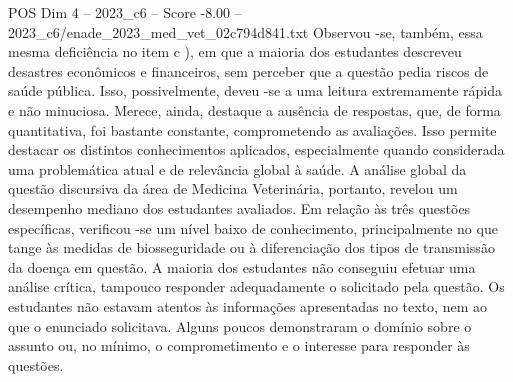 \begin{textsample}{POS Dim 4 – 2023\_c6 – Score -8.00 – 2023\_c6/enade\_2023\_med\_vet\_02c794d841.txt}
Observou -se, também, essa mesma deficiência no item c ), em que a maioria dos estudantes descreveu desastres econômicos e financeiros, sem perceber que a questão pedia riscos de saúde pública.
Isso, possivelmente, deveu -se a uma leitura extremamente rápida e não minuciosa.
Merece, ainda, destaque a ausência de respostas, que, de forma quantitativa, foi bastante constante, comprometendo as avaliações.
Isso permite destacar os distintos conhecimentos aplicados, especialmente quando considerada uma problemática atual e de relevância global à saúde.
A análise global da questão discursiva da área de Medicina Veterinária, portanto, revelou um desempenho mediano dos estudantes avaliados.
Em relação às três questões específicas, verificou -se um nível baixo de conhecimento, principalmente no que tange às medidas de biosseguridade ou à diferenciação dos tipos de transmissão da doença em questão.
A maioria dos estudantes não conseguiu efetuar uma análise crítica, tampouco responder adequadamente o solicitado pela questão.
Os estudantes não estavam atentos às informações apresentadas no texto, nem ao que o enunciado solicitava.
Alguns poucos demonstraram o domínio sobre o assunto ou, no mínimo, o comprometimento e o interesse para responder às questões.

\end{textsample}
